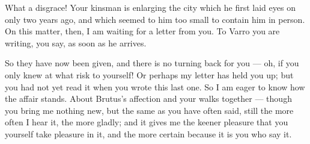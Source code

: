 

 What a disgrace! Your kinsman is enlarging the city which he first laid eyes on only two years ago, and which seemed to him too small to contain him in person. On this matter, then, I am waiting for a letter from you. To Varro you are writing, you say, as soon as he arrives.

 So they have now been given, and there is no turning back for you --- oh, if you only knew at what risk to yourself! Or perhaps my letter has held you up; but you had not yet read it when you wrote this last one. So I am eager to know how the affair stands. About Brutus's affection and your walks together --- though you bring me nothing new, but the same as you have often said, still the more often I hear it, the more gladly; and it gives me the keener pleasure that you yourself take pleasure in it, and the more certain because it is you who say it.
